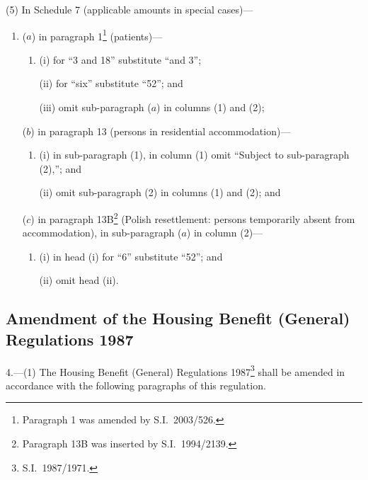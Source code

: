 \documentclass[12pt,a4paper]{article}
\begin{document}
(5) In Schedule 7 (applicable amounts in special cases)—
\begin{enumerate}\item[]
($a$) in paragraph 1\footnote{Paragraph 1 was amended by S.I.\ 2003/526.} (patients)—
\begin{enumerate}\item[]
(i) for “3 and 18” substitute “and 3”;

(ii) for “six” substitute “52”; and

(iii) omit sub-paragraph ($a$)  in columns (1) and (2);
\end{enumerate}

($b$) in paragraph 13 (persons in residential accommodation)—
\begin{enumerate}\item[]
(i) in sub-paragraph (1), in column (1) omit “Subject to sub-paragraph (2),”; and

(ii) omit sub-paragraph (2) in columns (1) and (2); and
\end{enumerate}

($c$) in paragraph 13B\footnote{Paragraph 13B was inserted by S.I.\ 1994/2139.} (Polish resettlement: persons temporarily absent from accommodation), in sub-paragraph ($a$)  in column (2)—
\begin{enumerate}\item[]
(i) in head (i)  for “6” substitute “52”; and

(ii) omit head (ii).
\end{enumerate}
\end{enumerate}

\subsection[4. Amendment of the Housing Benefit (General) Regulations 1987]{\sloppy Amendment of the Housing Benefit (General) Regulations 1987}

4.---(1)  The Housing Benefit (General) Regulations 1987\footnote{S.I.\ 1987/1971.} shall be amended in accordance with the following paragraphs of this regulation.
\end{document}
